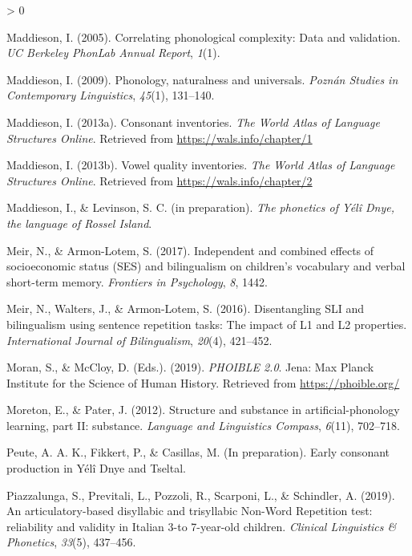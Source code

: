 \documentclass[
  english,
  ,man,floatsintext]{apa6}
\newlength{\cslhangindent}
\newenvironment{CSLReferences}[2] %
 {%
  \setlength{\parindent}{0pt}
  \ifodd #1 \everypar{\setlength{\hangindent}{\cslhangindent}}\ignorespaces\fi
  \ifnum #2 > 0
  \setlength{\parskip}{#2\baselineskip}
  \fi
 }%
 {}
\begin{document}
\begin{CSLReferences}{1}{0}
\leavevmode\hypertarget{ref-maddieson2005correlating}{}%
Maddieson, I. (2005). Correlating phonological complexity: Data and validation. \emph{UC Berkeley PhonLab Annual Report}, \emph{1}(1).

\leavevmode\hypertarget{ref-maddieson2009phonology}{}%
Maddieson, I. (2009). Phonology, naturalness and universals. \emph{Pozn{á}n Studies in Contemporary Linguistics}, \emph{45}(1), 131--140.

\leavevmode\hypertarget{ref-maddieson2013consonant}{}%
Maddieson, I. (2013a). Consonant inventories. \emph{The World Atlas of Language Structures Online}. Retrieved from \url{https://wals.info/chapter/1}

\leavevmode\hypertarget{ref-maddieson2013vowel}{}%
Maddieson, I. (2013b). Vowel quality inventories. \emph{The World Atlas of Language Structures Online}. Retrieved from \url{https://wals.info/chapter/2}

\leavevmode\hypertarget{ref-maddiesonIPphoneticsYD}{}%
Maddieson, I., \& Levinson, S. C. (in preparation). \emph{The phonetics of {Yélî Dnye}, the language of {Rossel Island}}.

\leavevmode\hypertarget{ref-meir2017independent}{}%
Meir, N., \& Armon-Lotem, S. (2017). Independent and combined effects of socioeconomic status ({SES}) and bilingualism on children's vocabulary and verbal short-term memory. \emph{Frontiers in Psychology}, \emph{8}, 1442.

\leavevmode\hypertarget{ref-meir2016disentangling}{}%
Meir, N., Walters, J., \& Armon-Lotem, S. (2016). {Disentangling SLI and bilingualism using sentence repetition tasks: The impact of L1 and L2 properties}. \emph{International Journal of Bilingualism}, \emph{20}(4), 421--452.

\leavevmode\hypertarget{ref-phoible}{}%
Moran, S., \& McCloy, D. (Eds.). (2019). \emph{PHOIBLE 2.0}. Jena: Max Planck Institute for the Science of Human History. Retrieved from \url{https://phoible.org/}

\leavevmode\hypertarget{ref-moreton2012structure}{}%
Moreton, E., \& Pater, J. (2012). Structure and substance in artificial-phonology learning, part {II}: substance. \emph{Language and Linguistics Compass}, \emph{6}(11), 702--718.

\leavevmode\hypertarget{ref-peuteIPconsonants}{}%
Peute, A. A. K., Fikkert, P., \& Casillas, M. (In preparation). Early consonant production in {Y}élî {D}nye and {T}seltal.

\leavevmode\hypertarget{ref-piazzalunga2019articulatory}{}%
Piazzalunga, S., Previtali, L., Pozzoli, R., Scarponi, L., \& Schindler, A. (2019). {An articulatory-based disyllabic and trisyllabic Non-Word Repetition test: reliability and validity in Italian 3-to 7-year-old children}. \emph{Clinical Linguistics \& Phonetics}, \emph{33}(5), 437--456.


\end{CSLReferences}
\end{document}
